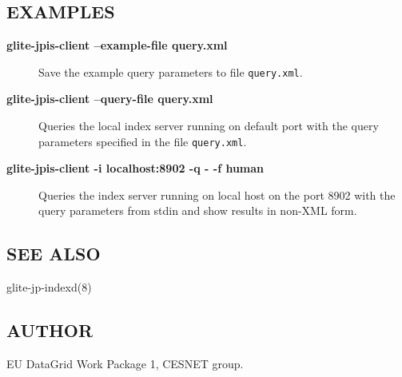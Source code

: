 \subsection*{EXAMPLES}
\label{id2417822}

\begin{description}
\item[{{\bfseries{glite-jpis-client --example-file query.xml}}}]\null{}
Save the example query parameters to file {\texttt{{query.\dbz{}xml}}}.
\item[{{\bfseries{glite-jpis-client --query-file query.xml}}}]\null{}
Queries the local index server running on default port with the query parameters specified in the file {\texttt{{query.\dbz{}xml}}}.
\item[{{\bfseries{glite-jpis-client -i localhost:8902 -q - -f human}}}]\null{}
Queries the index server running on local host on the port 8902 with the query parameters from stdin and show results in non-XML form.
\end{description}
\noindent 


\subsection*{SEE ALSO}
\label{id2418102}

glite-jp-indexd(8)

\subsection*{AUTHOR}
\label{id2418112}

EU DataGrid Work Package 1, CESNET group.
